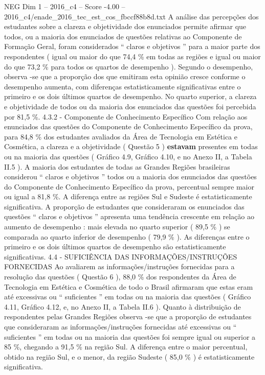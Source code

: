 \begin{textsample}{NEG Dim 1 – 2016\_c4 – Score -4.00 – 2016\_c4/enade\_2016\_tec\_est\_cos\_fbccf88b8d.txt}
A análise das percepções dos estudantes sobre a clareza e objetividade dos enunciados permite afirmar que todos, ou a maioria dos enunciados de questões relativas ao Componente de Formação Geral, foram considerados “ claros e objetivos ” para a maior parte dos respondentes ( igual ou maior do que 74,4 \% em todas as regiões e igual ou maior do que 73,2 \% para todos os quartos de desempenho ).
Segundo o desempenho, observa -se que a proporção dos que emitiram esta opinião cresce conforme o desempenho aumenta, com diferenças estatisticamente significativas entre o primeiro e os dois últimos quartos de desempenho.
No quarto superior, a clareza e objetividade de todos ou da maioria dos enunciados das questões foi percebida por 81,5 \%. 4.3.2 - Componente de Conhecimento Específico Com relação aos enunciados das questões do Componente de Conhecimento Específico da prova, para 84,8 \% dos estudantes avaliados da Área de Tecnologia em Estética e Cosmética, a clareza e a objetividade ( Questão 5 ) \textbf{estavam} presentes em todas ou na maioria das questões ( Gráfico 4.9, Gráfico 4.10, e no Anexo II, a Tabela II.5 ).
A maioria dos estudantes de todas as Grandes Regiões brasileiras considerou “ claros e objetivos ” todos ou a maioria dos enunciados das questões do Componente de Conhecimento Específico da prova, percentual sempre maior ou igual a 81,8 \%.
A diferença entre as regiões Sul e Sudeste é estatisticamente significativa.
A proporção de estudantes que consideraram os enunciados das questões “ claros e objetivos ” apresenta uma tendência crescente em relação ao aumento de desempenho : mais elevada no quarto superior ( 89,5 \% ) se comparada ao quarto inferior de desempenho ( 79,9 \% ).
As diferenças entre o primeiro e os dois últimos quartos de desempenho são estatisticamente significativas. 4.4 - SUFICIÊNCIA DAS INFORMAÇÕES/INSTRUÇÕES FORNECIDAS Ao avaliarem as informações/instruções fornecidas para a resolução das questões ( Questão 6 ), 88,0 \% dos respondentes da Área de Tecnologia em Estética e Cosmética de todo o Brasil afirmaram que estas eram até excessivas ou “ suficientes ” em todas ou na maioria das questões ( Gráfico 4.11, Gráfico 4.12, e, no Anexo II, a Tabela II.6 ).
Quanto à distribuição de respondentes pelas Grandes Regiões observa -se que a proporção de estudantes que consideraram as informações/instruções fornecidas até excessivas ou “ suficientes ” em todas ou na maioria das questões foi sempre igual ou superior a 85 \%, chegando a 91,5 \% na região Sul.
A diferença entre o maior percentual, obtido na região Sul, e o menor, da região Sudeste ( 85,0 \% ) é estatisticamente significativa.

\end{textsample}

